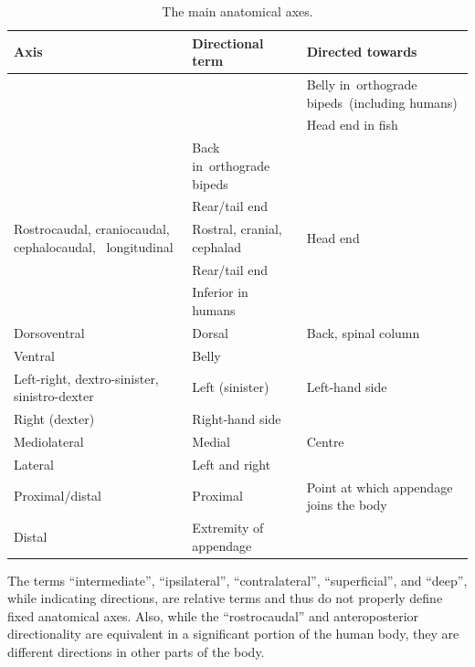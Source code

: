 \begin{longtable}[t]{>{\raggedright\arraybackslash}p{15em}>{\raggedright\arraybackslash}p{10em}>{\raggedright\arraybackslash}p{10em}}
\caption{\label{tab:axes}The main anatomical axes.}\\
\toprule
Axis & Directional term & Directed towards\\
\midrule
\rowcolor{gray!6}   &  & Belly in orthograde bipeds (including humans)\\

\multirow{-2}{15em}{\raggedright\arraybackslash Anteroposterior} & \multirow{-2}{10em}{\raggedright\arraybackslash Anterior} & Head end in fish\\
\cmidrule{1-3}
\rowcolor{gray!6}   & Back in orthograde bipeds & \\

\multirow{-2}{15em}{\raggedright\arraybackslash Posterior} & Rear/tail end & \\
\cmidrule{1-3}
\rowcolor{gray!6}  Rostrocaudal, craniocaudal, cephalocaudal,  longitudinal & Rostral, cranial, cephalad & Head end\\
\cmidrule{1-3}
 & Rear/tail end & \\

\rowcolor{gray!6}  \multirow{-2}{15em}{\raggedright\arraybackslash Caudal} & Inferior in humans & \\
\cmidrule{1-3}
Dorsoventral & Dorsal & Back, spinal column\\
\cmidrule{1-3}
\rowcolor{gray!6}  Ventral & Belly & \\
\cmidrule{1-3}
Left-right, dextro-sinister, sinistro-dexter & Left (sinister) & Left-hand side\\
\cmidrule{1-3}
\rowcolor{gray!6}  Right (dexter) & Right-hand side & \\
\cmidrule{1-3}
Mediolateral & Medial & Centre\\
\cmidrule{1-3}
\rowcolor{gray!6}  Lateral & Left and right & \\
\cmidrule{1-3}
Proximal/distal & Proximal & Point at which appendage joins the body\\
\cmidrule{1-3}
\rowcolor{gray!6}  Distal & Extremity of appendage & \\
\bottomrule
\end{longtable}

The terms ``intermediate'', ``ipsilateral'', ``contralateral'', ``superficial'', and ``deep'', while indicating directions, are relative terms and thus do not properly define fixed anatomical axes. Also, while the ``rostrocaudal'' and anteroposterior directionality are equivalent in a significant portion of the human body, they are different directions in other parts of the body.

